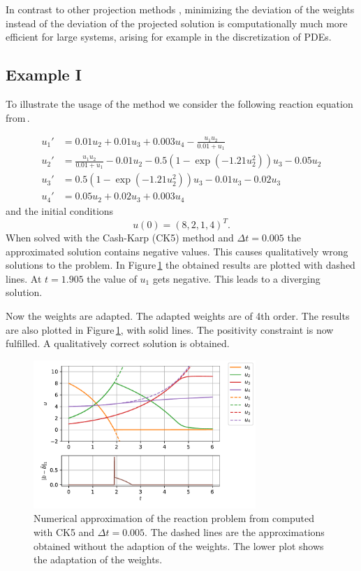 \documentclass[a4paper]{article}
\numberwithin{equation}{section}
\theoremstyle{plain}
\theoremstyle{definition}
\numberwithin{theorem}{section}
\newcommand{\dt}{{\Delta t}}
\newcommand{\1}{\mathbbm{1}}
\begin{document}
In contrast to other projection methods
\cite{shampine1986conservation,sandu2001positive},
minimizing the deviation of the weights instead of the deviation
of the projected solution is computationally much more efficient
for large systems, arising for example in the discretization of
PDEs.


\subsection{Example I}\label{sec:example_reac}

To illustrate the usage of the method we consider the following reaction equation from\,\cite{kopecz_comparison_2019}.

\begin{subequations}
\label{eq:Reaction}
\begin{align}
u_1' &= 0.01u_2 + 0.01 u_3 +0.003u_4 - \frac{u_1 u_2}{0.01+u_1} \\ 
u_2' &= \frac{u_1u_2}{0.01+u_1}-0.01 u_2-0.5(1-\exp(-1.21 u_2^2)) u_3 -0.05 u_2 \\ 
u_3' &= 0.5(1-\exp(-1.21u_2^2)) u_3 - 0.01 u_3 -0.02 u_3 \\ 
u_4' &=0.05 u_2 + 0.02 u_3 + 0.003u_4 
\end{align}
\end{subequations}
and the initial conditions
\begin{equation}
u(0) = (8,2,1,4)^T.
\end{equation}
When solved with the Cash-Karp (CK5) method and $\dt = 0.005$ the approximated solution contains negative values. This causes qualitatively wrong solutions to the problem. 
In Figure\,\ref{fig:exampleI} the obtained results are plotted with dashed lines. 
At $t=1.905$ the value of $u_1$ gets negative. This leads to a diverging solution.

Now the weights are adapted. The adapted weights are of 4th order. The results are also plotted in Figure\,\ref{fig:exampleI}, with solid lines. 
The positivity constraint is now fulfilled. A qualitatively correct solution is obtained.

\begin{figure}[ht]
    \centering
    \includegraphics[width=0.75\textwidth]{plots/exampleI.pdf}
    \caption{Numerical approximation of the reaction problem from \cite{kopecz_comparison_2019} computed with CK5 and $\dt = 0.005$. The dashed lines are the approximations obtained without the adaption of the weights. The lower plot shows the adaptation of the weights. }
    \label{fig:exampleI}
\end{figure}
\end{document}
